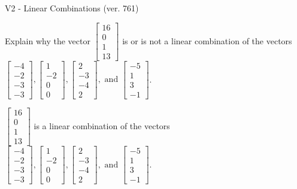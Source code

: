 \begin{exercise}
  \begin{exerciseTitle}V2 - Linear Combinations (ver. 761)\end{exerciseTitle}
  \begin{exerciseStatement}
    Explain why the vector \(\left[\begin{array}{c}
16 \\
0 \\
1 \\
13
\end{array}\right]\)  is or is not a linear 
	combination of the vectors \(\left[\begin{array}{c}
-4 \\
-2 \\
-3 \\
-3
\end{array}\right] , \left[\begin{array}{c}
1 \\
-2 \\
0 \\
0
\end{array}\right] , \left[\begin{array}{c}
2 \\
-3 \\
-4 \\
2
\end{array}\right] , \text{ and } \left[\begin{array}{c}
-5 \\
1 \\
3 \\
-1
\end{array}\right]\).
	


  \end{exerciseStatement}
  \begin{exerciseAnswer}
   \(\left[\begin{array}{c}
16 \\
0 \\
1 \\
13
\end{array}\right]\) 
  	 is  
	a linear combination of the vectors \(\left[\begin{array}{c}
-4 \\
-2 \\
-3 \\
-3
\end{array}\right] , \left[\begin{array}{c}
1 \\
-2 \\
0 \\
0
\end{array}\right] , \left[\begin{array}{c}
2 \\
-3 \\
-4 \\
2
\end{array}\right] , \text{ and } \left[\begin{array}{c}
-5 \\
1 \\
3 \\
-1
\end{array}\right]\).


\end{exerciseAnswer}
\end{exercise}
